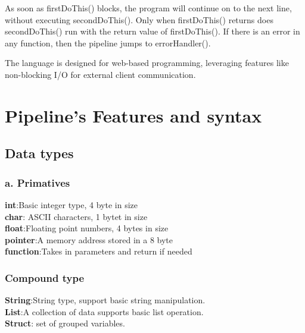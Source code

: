 \documentclass[11pt]{article}
\begin{document}
As soon as firstDoThis() blocks, the program will continue on to the next line, 
without executing secondDoThis(). Only when firstDoThis() returns does 
secondDoThis() run with the return value of firstDoThis(). If there is an 
error in any function, then the pipeline jumps to errorHandler().

The language is designed for web-based programming, leveraging features like 
non-blocking I/O for external client communication. 

\section{Pipeline's Features and syntax}
\subsection*{Data types}

\subsubsection*{a. Primatives}

\begin{adjustwidth}{1cm}{}
\textbf{int}:Basic integer type, 4 byte in size \\
\textbf{char}: ASCII characters, 1 bytet in size\\
\textbf{float}:Floating point numbers, 4 bytes in size\\
\textbf{pointer}:A memory address stored in a 8 byte\\
\textbf{function}:Takes in parameters and return if needed
\end{adjustwidth}

\subsubsection{Compound type}

\begin{adjustwidth}{1cm}{}
\textbf{String}:String type, support basic string manipulation.\\
\textbf{List}:A collection of data supports basic list operation.\\
\textbf{Struct}: set of grouped variables.\\
\end{adjustwidth}
\end{document}
